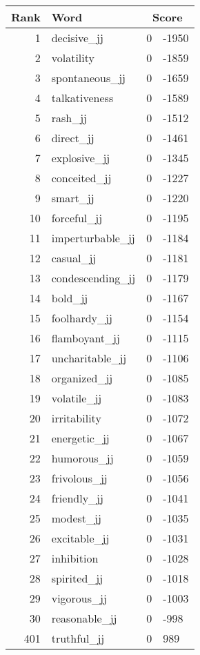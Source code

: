 \begin{longtable}[!htbp]{| rlr@{.}l |}
    \hline
    \textbf{Rank} & \textbf{Word} & \multicolumn{2}{c|}{\textbf{Score}} \\
    \hline
    \endhead
    1 & decisive\_jj & 0 & -1950 \\
    2 & volatility & 0 & -1859 \\
    3 & spontaneous\_jj & 0 & -1659 \\
    4 & talkativeness & 0 & -1589 \\
    5 & rash\_jj & 0 & -1512 \\
    6 & direct\_jj & 0 & -1461 \\
    7 & explosive\_jj & 0 & -1345 \\
    8 & conceited\_jj & 0 & -1227 \\
    9 & smart\_jj & 0 & -1220 \\
    10 & forceful\_jj & 0 & -1195 \\
    11 & imperturbable\_jj & 0 & -1184 \\
    12 & casual\_jj & 0 & -1181 \\
    13 & condescending\_jj & 0 & -1179 \\
    14 & bold\_jj & 0 & -1167 \\
    15 & foolhardy\_jj & 0 & -1154 \\
    16 & flamboyant\_jj & 0 & -1115 \\
    17 & uncharitable\_jj & 0 & -1106 \\
    18 & organized\_jj & 0 & -1085 \\
    19 & volatile\_jj & 0 & -1083 \\
    20 & irritability & 0 & -1072 \\
    21 & energetic\_jj & 0 & -1067 \\
    22 & humorous\_jj & 0 & -1059 \\
    23 & frivolous\_jj & 0 & -1056 \\
    24 & friendly\_jj & 0 & -1041 \\
    25 & modest\_jj & 0 & -1035 \\
    26 & excitable\_jj & 0 & -1031 \\
    27 & inhibition & 0 & -1028 \\
    28 & spirited\_jj & 0 & -1018 \\
    29 & vigorous\_jj & 0 & -1003 \\
    30 & reasonable\_jj & 0 & -998 \\
    401 & truthful\_jj & 0 & 989 \\

\end{longtable}
